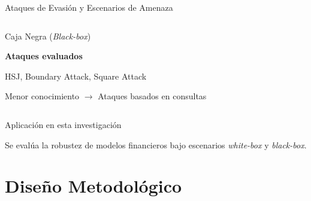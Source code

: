 \documentclass[aspectratio=169, 8pt]{beamer}
\begin{document}
\begin{frame}{Ataques de Evasión y Escenarios de Amenaza}
\begin{columns}
\begin{block}{Caja Negra (\textit{Black-box})}
\vspace{0.1cm}

\textbf{Ataques evaluados}

HSJ, Boundary Attack,
Square Attack

\vspace{0.1cm}

\scriptsize
Menor conocimiento $\rightarrow$
Ataques basados en consultas

\end{block}

\end{columns}

\vspace{0.2cm}

\begin{exampleblock}{Aplicación en esta investigación}

Se evalúa la robustez de modelos financieros
bajo escenarios \textit{white-box}
y \textit{black-box}.

\end{exampleblock}

\end{frame}

\begin{frame}
\vfill
\centering
{\fontsize{28}{34}\selectfont\bfseries 
{}}
\vfill
\end{frame}
\section{Diseño Metodológico}
\end{document}
